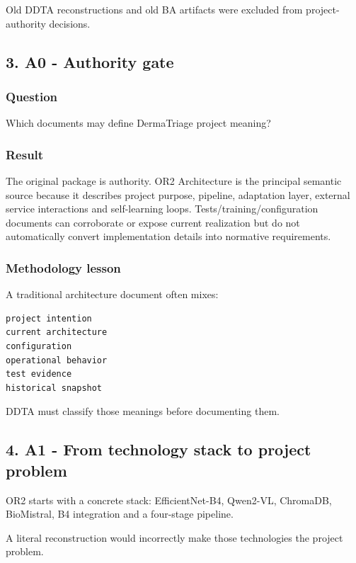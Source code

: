 \documentclass[11pt,a4paper]{article}
\begin{document}
Old DDTA reconstructions and old BA artifacts were excluded from
project-authority decisions.

\subsection{3. A0 - Authority gate}\label{3-a0---authority-gate}

\subsubsection{Question}\label{question}

Which documents may define DermaTriage project meaning?

\subsubsection{Result}\label{result}

The original package is authority. OR2 Architecture is the principal
semantic source because it describes project purpose, pipeline,
adaptation layer, external service interactions and self-learning loops.
Tests/training/configuration documents can corroborate or expose current
realization but do not automatically convert implementation details into
normative requirements.

\subsubsection{Methodology lesson}\label{methodology-lesson}

A traditional architecture document often mixes:

\begin{verbatim}
project intention
current architecture
configuration
operational behavior
test evidence
historical snapshot
\end{verbatim}

DDTA must classify those meanings before documenting them.

\subsection{4. A1 - From technology stack to project
problem}\label{4-a1---from-technology-stack-to-project-problem}

OR2 starts with a concrete stack: EfficientNet-B4, Qwen2-VL, ChromaDB,
BioMistral, B4 integration and a four-stage pipeline.

A literal reconstruction would incorrectly make those technologies the
project problem.
\end{document}
